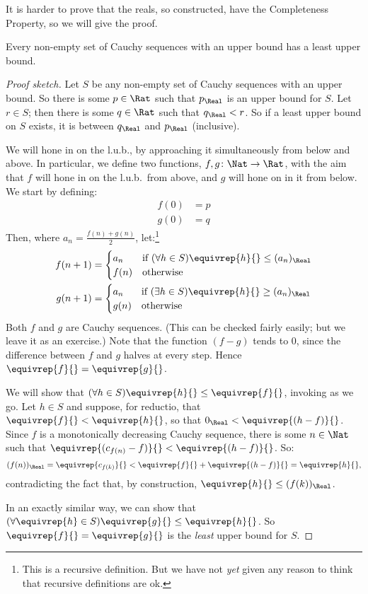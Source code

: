 \documentclass[../../../include/open-logic-section]{subfiles}
\begin{document}
It is harder to prove that the reals, so constructed, have the
Completeness Property, so we will give the proof.

\begin{thm}
Every non-empty set of Cauchy sequences with an upper bound has a
least upper bound.
\end{thm}

\begin{proof}[Proof sketch] Let $S$ be any non-empty set of Cauchy
sequences with an upper bound. So there is some $p \in \Rat$ such that
$p_{\Real}$ is an upper bound for $S$. Let $r \in S$; then there is
some $q \in \Rat$ such that $q_{\Real} < r$. So if a least upper bound
on $S$ exists, it is between $q_\Real$ and $p_\Real$ (inclusive). 

We will hone in on the l.u.b., by approaching it simultaneously from
below and above. In particular, we define two functions, $f, g \colon
\Nat \to \Rat$, with the aim that $f$ will hone in on the l.u.b.\ from
above, and $g$ will hone on in it from below. We start by defining:
\begin{align*}
	f(0) &= p \\
	g(0) &= q
\end{align*}
Then, where $a_n = \frac{f(n) + g(n)}{2}$, let:\footnote{This is a
recursive definition. But we have not \emph{yet} given any reason to
think that recursive definitions are ok.}
\begin{align*}
	f(n+1) &=
	\begin{cases}
		a_n &\text{if }(\forall h \in S)\equivrep{h}{} \leq (a_n)_\Real\\
		f(n)&\text{otherwise}
	\end{cases}\\
	g(n+1) &=
	\begin{cases}
		a_n &\text{if }(\exists h \in S)\equivrep{h}{} \geq (a_n)_\Real\\
	 	g(n) &\text{otherwise}
	\end{cases}
\end{align*}
Both $f$ and $g$ are Cauchy sequences. (This can be checked fairly
easily; but we leave it as an exercise.) Note that the function $(f-g)$
tends to $0$, since the difference between $f$ and $g$ halves at every
step. Hence $\equivrep{f}{} = \equivrep{g}{}$. 

We will show that $(\forall h \in S)\equivrep{h}{} \leq \equivrep{f}{}$, invoking  as we go. Let $h \in S$ and
suppose, for reductio, that $\equivrep{f}{} < \equivrep{h}{}$, so that
$0_\Real < \equivrep{(h-f)}{}$. Since $f$ is a monotonically
decreasing Cauchy sequence, there is some $n \in \Nat$ such that
$\equivrep{(c_{f(n)} - f)}{} < \equivrep{(h-f)}{}$. So:
\[
	(f(n))_\Real = \equivrep{c_{f(k)}}{} < \equivrep{f}{} + \equivrep{(h-f)}{} = \equivrep{h}{},
\]
contradicting the fact that, by construction, $\equivrep{h}{} \leq (f(k))_\Real$.

In an exactly similar way, we can show that $(\forall \equivrep{h} \in S)\equivrep{g}{} \leq \equivrep{h}{}$. So $\equivrep{f}{} = \equivrep{g}{}$ is the
\emph{least} upper bound for $S$.
\end{proof}
\end{document}
